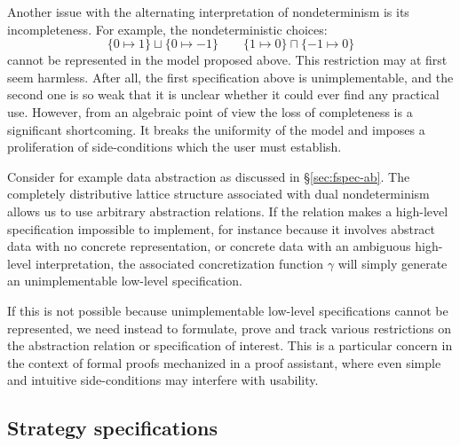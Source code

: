 \documentclass[11pt,oneside]{book}
\theoremstyle{definition}
\begin{document}
Another issue with the alternating interpretation
of nondeterminism is its incompleteness.
For example, the nondeterministic choices:
\[
  \{ 0 \mapsto 1 \} \sqcup \{ 0 \mapsto -1 \}
  \qquad
  \{ 1 \mapsto 0 \} \sqcap \{ -1 \mapsto 0 \}
\]
cannot be represented in the model proposed above.
This restriction may at first seem harmless.
After all,
the first specification above is unimplementable,
and the second one is so weak
that it is unclear whether
it could ever find any practical use.
However,
from an algebraic point of view
the loss of completeness is a significant shortcoming.
It breaks the uniformity of the model
and imposes a proliferation of side-conditions
which the user must establish.

Consider for example
data abstraction as discussed in \S\ref{sec:fspec-ab}.
The completely distributive lattice structure
associated with dual nondeterminism
allows us to use arbitrary abstraction relations.
If the relation makes a high-level specification
impossible to implement,
for instance because it involves abstract data
with no concrete representation,
or concrete data with an ambiguous high-level interpretation,
the associated concretization function $\gamma$
will simply generate an unimplementable
low-level specification.

If this is not possible because
unimplementable low-level specifications cannot be represented,
we need instead to formulate, prove and track various restrictions
on the abstraction relation or specification of interest.
This is a particular concern in the context of
formal proofs mechanized in a proof assistant,
where even simple and intuitive side-conditions
may interfere with usability.


\subsection{Strategy specifications} \label{sec:strategyspec} %
\end{document}
